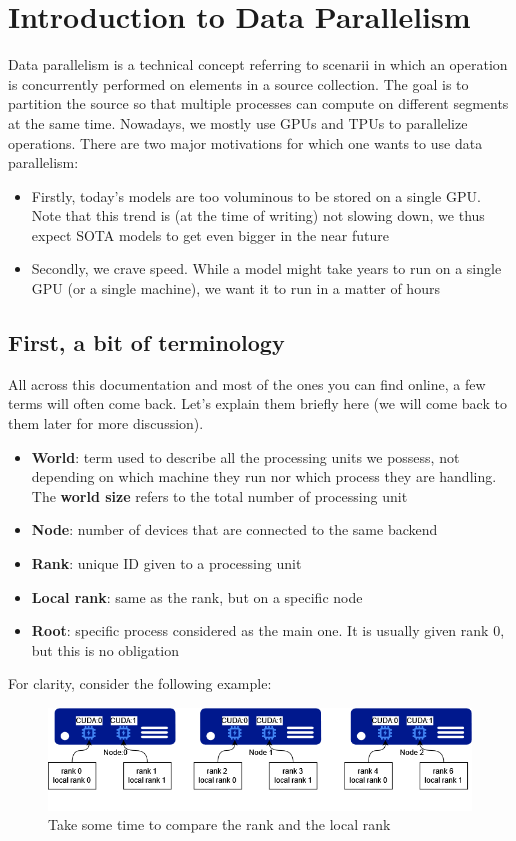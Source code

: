 \documentclass{article}
\begin{document}
\clearpage

\section{Introduction to Data Parallelism}
Data parallelism is a technical concept referring to scenarii in which an operation is concurrently performed on elements in a source collection. The goal is to partition the source so that multiple processes can compute on different segments at the same time. Nowadays, we mostly use GPUs and TPUs to parallelize operations. There are two major motivations for which one wants to use data parallelism:
\begin{itemize}
  \item Firstly, today's models are too voluminous to be stored on a single GPU. Note that this trend is (at the time of writing) not slowing down, we thus expect \Gls{SOTA} models to get even bigger in the near future
  \item Secondly, we crave speed. While a model might take years to run on a single GPU (or a single machine), we want it to run in a matter of hours
\end{itemize}

\subsection{First, a bit of terminology}
All across this documentation and most of the ones you can find online, a few terms will often come back. Let's explain them briefly here (we will come back to them later for more discussion).

\begin{itemize}
  \item \textbf{World}: term used to describe all the processing units we possess, not depending on which machine they run nor which process they are handling. The \textbf{world size} refers to the total number of processing unit
  \item \textbf{Node}: number of devices that are connected to the same backend
  \item \textbf{Rank}: unique ID given to a processing unit
  \item \textbf{Local rank}: same as the rank, but on a specific node
  \item \textbf{Root}: specific process considered as the main one. It is usually given rank 0, but this is no obligation
\end{itemize}
For clarity, consider the following example:
\begin{figure}[h!]
  \center
  \includegraphics[width=0.7\linewidth]{images/2022-08-24-17-37-31.png}
  \caption{Take some time to compare the rank and the local rank}
\end{figure}
\FloatBarrier
\end{document}
